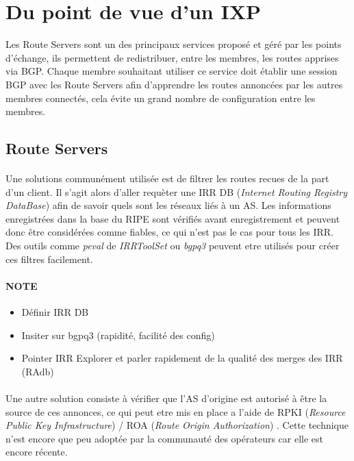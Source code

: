 \section{Du point de vue d'un IXP}

Les Route Servers sont un des principaux services proposé et géré par les points d'échange, ils permettent de redistribuer, entre les membres, les routes apprises via BGP. Chaque membre souhaitant utiliser ce service doit établir une session BGP avec les Route Servers afin d'apprendre les routes annoncées par les autres membres connectés, cela évite un grand nombre de configuration entre les membres.

\subsection{Route Servers}

\paragraph{}
Une solutions communément utilisée est de filtrer les routes recues de la part d'un client. Il s'agit alors d'aller requèter une IRR DB (\emph{Internet Routing Registry DataBase}) afin de savoir quels sont les réseaux liés à un AS. Les informations enregistrées dans la base du RIPE sont vérifiés avant enregistrement et peuvent donc être considérées comme fiables, ce qui n'est pas le cas pour tous les IRR. Des outils comme \emph{peval} de \emph{IRRToolSet}\cite{fenioux:IRRTOOLSET} ou \emph{bgpq3}\cite{fenioux:BGPQ3} peuvent etre utilisés pour créer ces filtres facilement.

\paragraph{NOTE}
\begin{itemize}
\item Définir IRR DB
\item Insiter sur bgpq3 (rapidité, facilité des config)
\item Pointer IRR Explorer et parler rapidement de la qualité des merges des IRR (RAdb)
\end{itemize}

\paragraph{}
Une autre solution consiste à vérifier que l'AS d'origine est autorisé à être la source de ces annonces, ce qui peut etre mis en place a l'aide de RPKI (\emph{Resource Public Key Infrastructure}) / ROA (\emph{Route Origin Authorization}) \cite{fenioux:RPKIROA}. Cette technique n'est encore que peu adoptée par la communauté des opérateurs car elle est encore récente.


